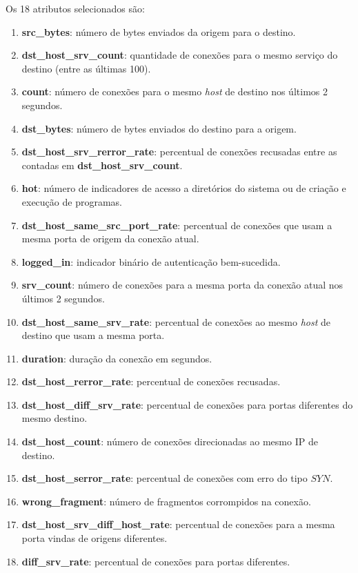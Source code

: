 \documentclass[a4paper,10pt, twocolumn]{article}
\begin{document}
Os 18 atributos selecionados são:
\begin{enumerate}
	\item \textbf{src\_bytes}: número de bytes enviados da origem para o destino.
	\item \textbf{dst\_host\_srv\_count}: quantidade de conexões para o mesmo serviço do destino (entre as últimas 100).
	\item \textbf{count}: número de conexões para o mesmo \textit{host} de destino nos últimos 2 segundos.
	\item \textbf{dst\_bytes}: número de bytes enviados do destino para a origem.
	\item \textbf{dst\_host\_srv\_rerror\_rate}: percentual de conexões recusadas entre as contadas em \textbf{dst\_host\_srv\_count}.
	\item \textbf{hot}: número de indicadores de acesso a diretórios do sistema ou de criação e execução de programas.
	\item \textbf{dst\_host\_same\_src\_port\_rate}: percentual de conexões que usam a mesma porta de origem da conexão atual.
	\item \textbf{logged\_in}: indicador binário de autenticação bem-sucedida.
	\item \textbf{srv\_count}: número de conexões para a mesma porta da conexão atual nos últimos 2 segundos.
	\item \textbf{dst\_host\_same\_srv\_rate}: percentual de conexões ao mesmo \textit{host} de destino que usam a mesma porta.
	\item \textbf{duration}: duração da conexão em segundos.
	\item \textbf{dst\_host\_rerror\_rate}: percentual de conexões recusadas.
	\item \textbf{dst\_host\_diff\_srv\_rate}: percentual de conexões para portas diferentes do mesmo destino.
	\item \textbf{dst\_host\_count}: número de conexões direcionadas ao mesmo IP de destino.
	\item \textbf{dst\_host\_serror\_rate}: percentual de conexões com erro do tipo $SYN$.
	\item \textbf{wrong\_fragment}: número de fragmentos corrompidos na conexão.
	\item \textbf{dst\_host\_srv\_diff\_host\_rate}: percentual de conexões para a mesma porta vindas de origens diferentes.
	\item \textbf{diff\_srv\_rate}: percentual de conexões para portas diferentes.
\end{enumerate}
\end{document}
